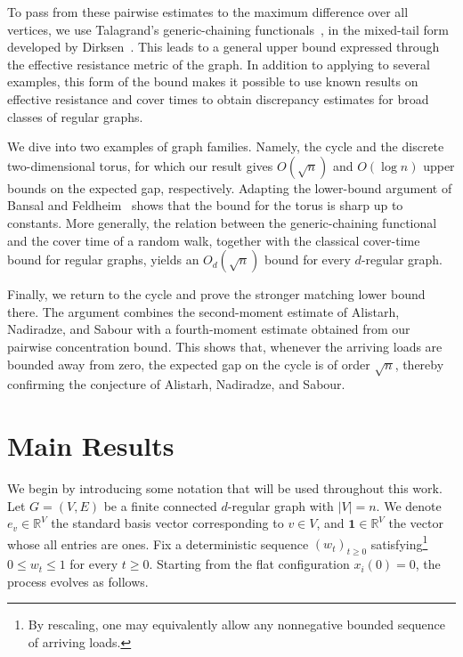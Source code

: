 \documentclass[11pt]{article}
\numberwithin{equation}{section}
\newcommand{\1}{\mathbf{1}}
\begin{document}
\medskip

To pass from these pairwise estimates to the maximum difference over all vertices, we use Talagrand's generic-chaining functionals~\cite{TalagrandOrig,TalagrandGamma}, in the mixed-tail form developed by Dirksen~\cite{DirksenGenericChaining}. This leads to a general upper bound expressed through the effective resistance metric of the graph. In addition to applying to several examples, this form of the bound makes it possible to use known results on effective resistance and cover times to obtain discrepancy estimates for broad classes of regular graphs.

\medskip

We dive into two examples of graph families. Namely, the cycle and the discrete two-dimensional torus, for which our result gives \(O(\sqrt n)\) and \(O(\log n)\) upper bounds on the expected gap, respectively. Adapting the lower-bound argument of Bansal and Feldheim~\cite{BansalFeldheim} shows that the bound for the torus is sharp up to constants. More generally, the relation between the generic-chaining functional and the cover time of a random walk, together with the classical cover-time bound for regular graphs, yields an \(O_d(\sqrt n)\) bound for every \(d\)-regular graph.


\medskip

Finally, we return to the cycle and prove the stronger matching lower bound there. The argument combines the second-moment estimate of Alistarh, Nadiradze, and Sabour with a fourth-moment estimate obtained from our pairwise concentration bound. This shows that, whenever the arriving loads are bounded away from zero, the expected gap on the cycle is of order \(\sqrt n\), thereby confirming the conjecture of Alistarh, Nadiradze, and Sabour.


\section{Main Results}
\label{sec:main-results}

We begin by introducing some notation that will be used throughout this work. Let \(G=(V,E)\) be a finite connected \(d\)-regular graph with \(|V|=n.\) We denote \(e_v\in\mathbb R^V\) the standard basis vector corresponding to \(v\in V\), and \(\1\in\mathbb R^V\) the vector whose all entries are ones.
Fix a deterministic sequence \((w_t)_{t\ge0}\) satisfying\footnote{By rescaling, one may equivalently allow any nonnegative bounded sequence of arriving loads.}
\(
0\le w_t\le1
\)
for every \(t\ge0\). Starting from the flat configuration \(x_i(0)=0\), the process evolves as follows. 
\end{document}
